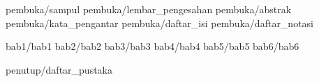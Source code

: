 \documentclass[a5paper, twoside, 11pt, listof=nochaptergap, bahasa] {book}
\begin{document}
\begin{sloppypar}
	
	\pagestyle {normal}
	
	\frontmatter
		 {pembuka/sampul}
		 {pembuka/lembar_pengesahan}
		 {pembuka/abstrak}
		 {pembuka/kata_pengantar}
		 {pembuka/daftar_isi}
		 {pembuka/daftar_notasi}
	
	\mainmatter
		 {bab1/bab1} \cleardoublepage
		 {bab2/bab2} \cleardoublepage
		 {bab3/bab3} \cleardoublepage
		 {bab4/bab4} \cleardoublepage
		 {bab5/bab5} \cleardoublepage
	 	 {bab6/bab6} \cleardoublepage
	
	\backmatter
	 	 {penutup/daftar_pustaka}
		
\end{sloppypar}
\end{document}
